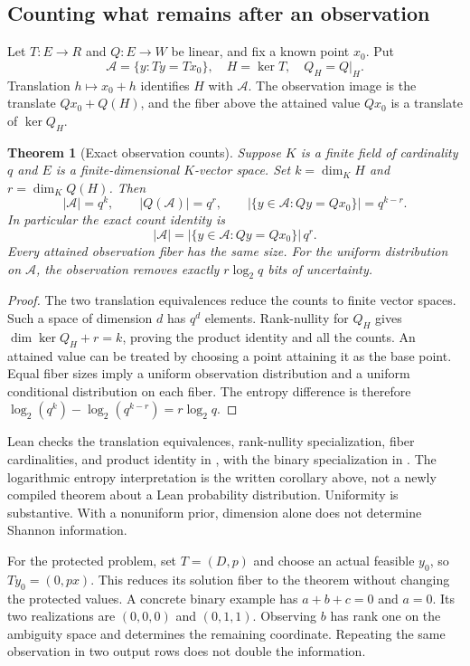\documentclass[11pt,oneside]{article}
\theoremstyle{komorebiplain}
\newtheorem{theorem}{Theorem}[section]
\theoremstyle{komorebidefinition}
\theoremstyle{komorebiremark}
\begin{document}
\subsection{Counting what remains after an observation}

Let $T:E\to R$ and $Q:E\to W$ be linear, and fix a known point $x_0$. Put
\[
\mathcal A=\{y:Ty=Tx_0\},\quad H=\ker T,\quad
Q_H=Q|_H.
\]
Translation $h\mapsto x_0+h$ identifies $H$ with $\mathcal A$. The observation image is the translate $Qx_0+Q(H)$, and the fiber above the attained value $Qx_0$ is a translate of $\ker Q_H$.

\begin{theorem}[Exact observation counts]
\label{res:24:6}
\label{thm:checked-counts}
Suppose $K$ is a finite field of cardinality $q$ and $E$ is a finite-dimensional $K$-vector space. Set
$k=\dim_K H$ and $r=\dim_K Q(H)$. Then
\[
|\mathcal A|=q^k,\qquad
|Q(\mathcal A)|=q^r,\qquad
|\{y\in\mathcal A:Qy=Qx_0\}|=q^{k-r}.
\]
In particular the exact count identity is
\[
|\mathcal A|=
|\{y\in\mathcal A:Qy=Qx_0\}|\,q^r.
\]
Every attained observation fiber has the same size. For the uniform distribution on $\mathcal A$, the observation removes exactly $r\log_2q$ bits of uncertainty.
\end{theorem}
\begin{proof}
The two translation equivalences reduce the counts to finite vector spaces. Such a space of dimension $d$ has $q^d$ elements. Rank-nullity for $Q_H$ gives $\dim\ker Q_H+r=k$, proving the product identity and all the counts. An attained value can be treated by choosing a point attaining it as the base point. Equal fiber sizes imply a uniform observation distribution and a uniform conditional distribution on each fiber. The entropy difference is therefore $\log_2(q^k)-\log_2(q^{k-r})=r\log_2q$.
\end{proof}

Lean checks the translation equivalences, rank-nullity specialization, fiber cardinalities, and product identity in , with the binary specialization in . The logarithmic entropy interpretation is the written corollary above, not a newly compiled theorem about a Lean probability distribution. Uniformity is substantive. With a nonuniform prior, dimension alone does not determine Shannon information.

For the protected problem, set $T=(D,p)$ and choose an actual feasible $y_0$, so $Ty_0=(0,px)$. This reduces its solution fiber to the theorem without changing the protected values. A concrete binary example has $a+b+c=0$ and $a=0$. Its two realizations are $(0,0,0)$ and $(0,1,1)$. Observing $b$ has rank one on the ambiguity space and determines the remaining coordinate. Repeating the same observation in two output rows does not double the information.
\end{document}
